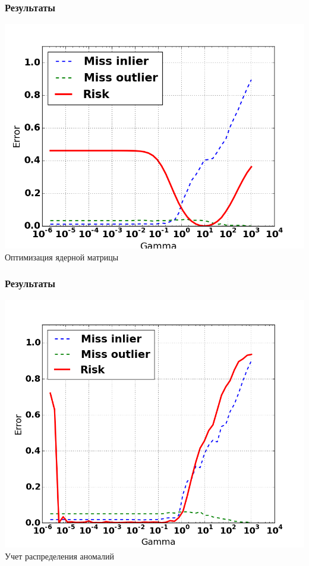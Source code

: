 \documentclass[10pt,pdf]{beamer}
\begin{document}
\begin{frame}\frametitle{Результаты}
\centering
\includegraphics[scale=0.35]{kernel_metric}\\
Оптимизация ядерной матрицы
\end{frame}


\begin{frame}\frametitle{Результаты}
\centering
\includegraphics[scale=0.35]{slice_error}\\
Учет распределения аномалий
\end{frame}
\end{document}
